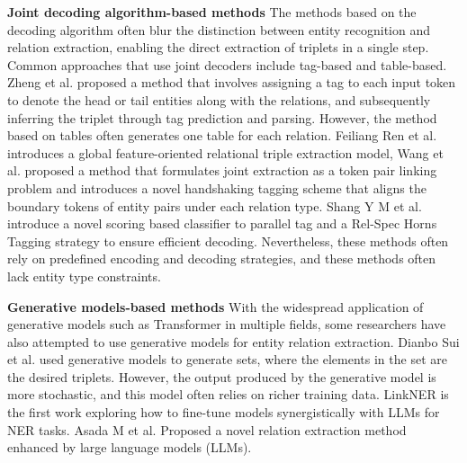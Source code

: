 \textbf{Joint decoding algorithm-based methods} The methods based on the decoding algorithm often blur the distinction between entity recognition and relation extraction, enabling the direct extraction of triplets in a single step. Common approaches that use joint decoders include tag-based and table-based. Zheng et al.\cite{zheng-etal-2017-joint} proposed a method that involves assigning a tag to each input token to denote the head or tail entities along with the relations, and subsequently inferring the triplet through tag prediction and parsing. However, the method based on tables often generates one table for each relation. Feiliang Ren et al.\cite{ren-etal-2021-novel} introduces a global feature-oriented relational triple extraction model, Wang et al.\cite{wang-etal-2020-tplinker} proposed a method that formulates joint extraction as a token pair linking problem and introduces a novel handshaking tagging scheme that aligns the boundary tokens of entity pairs under each relation type. Shang Y M et al.\cite{shang2022onerel} introduce a novel scoring based classifier to parallel tag and a Rel-Spec Horns Tagging strategy to ensure efficient decoding. Nevertheless, these methods often rely on predefined encoding and decoding strategies, and these methods often lack entity type constraints.

\textbf{Generative models-based methods} With the widespread application of generative models such as Transformer\cite{vaswani2017attention} in multiple fields, some researchers have also attempted to use generative models for entity relation extraction. Dianbo Sui et al.\cite{sui2023joint} used generative models to generate sets, where the elements in the set are the desired triplets. However, the output produced by the generative model is more stochastic, and this model often relies on richer training data. LinkNER\cite{zhang2024linkner} is the first work exploring how to fine-tune models synergistically with LLMs for NER tasks. Asada M et al.\cite{asada2024enhancing} Proposed a novel relation extraction method enhanced by large language models (LLMs).